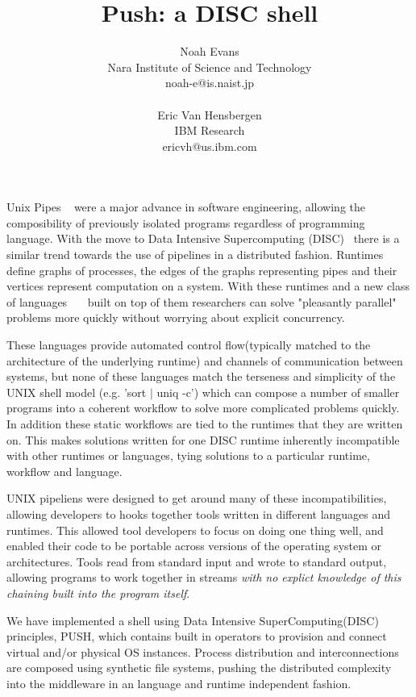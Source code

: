 \documentclass[11pt, letterpaper]{article}
\title{Push: a DISC shell}
\author{Noah Evans\\
Nara Institute of Science and Technology\\
noah-e@is.naist.jp\\\\
Eric Van Hensbergen\\
IBM Research\\
ericvh@us.ibm.com\\
}
\date{}
\begin{document}
\maketitle

Unix Pipes ~\cite{mcilroy1964paf} were a major advance in software engineering, 
allowing the composibility of previously isolated programs regardless of 
programming language. 
With the move to 
Data Intensive Supercomputing (DISC)~\cite{bryant2007dis} 
there is a similar trend towards the use of pipelines in a distributed fashion. 
Runtimes ~\cite{dean2008msd}~\cite{bialecki:hfr}~\cite{isard2007ddd} define 
graphs of processes, the edges of the graphs representing 
pipes and their vertices represent computation on a system.  
With these runtimes and 
a new class of languages~\cite{pike2005idp}~\cite{yu2008dsg}~\cite{olston2008pln} 
built on top of them researchers can solve "pleasantly parallel" 
problems more quickly without worrying about explicit concurrency.

These languages provide automated control flow(typically matched to the 
architecture of the underlying runtime) and channels of communication between 
systems, but none of these languages match the terseness and simplicity of 
the UNIX shell model (e.g. 'sort $|$ uniq -c') which can compose a number of 
smaller programs into a coherent workflow to solve more complicated problems 
quickly. In addition these static workflows are tied to the runtimes that they 
are written on. This makes solutions written for one DISC runtime inherently 
incompatible with other runtimes or languages, tying solutions to a particular 
runtime, workflow and language.

UNIX pipeliens were designed to get around many of these incompatibilities, 
allowing developers to hooks together tools written in different languages and
runtimes.  This allowed tool developers to focus on doing one thing well, and
enabled their code to be portable across versions of the operating system or
architectures.  
Tools read from standard input and wrote to standard output, allowing programs 
to work together in streams \emph{with no explict knowledge of this chaining
built into the program itself}.

We have implemented a shell using Data Intensive SuperComputing(DISC) 
principles, PUSH, which contains built in operators to provision and connect 
virtual and/or physical OS instances.  Process distribution and interconnections 
are composed using synthetic file systems, pushing the distributed complexity 
into the middleware in an language and runtime independent fashion.
\end{document}
